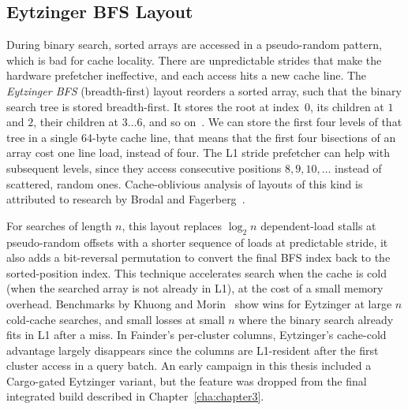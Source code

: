 \subsection{Eytzinger BFS Layout\label{sec:bg:eytzinger}}

During binary search, sorted arrays are accessed in a pseudo-random pattern, which is bad for cache locality. There are unpredictable strides that make the hardware prefetcher ineffective, and each access hits a new cache line. The \emph{Eytzinger BFS} (breadth-first) layout reorders a sorted array, such that the binary search tree is stored breadth-first. It stores the root at index~$0$, its children at $1$ and $2$, their children at $3\ldots 6$, and so on~\cite{khuong_morin_2017}. We can store the first four levels of that tree in a single 64-byte cache line, that means that the first four bisections of an array cost one line load, instead of four. The L1 stride prefetcher can help with subsequent levels, since they access consecutive positions $8, 9, 10, \ldots$ instead of scattered, random ones. Cache-oblivious analysis of layouts of this kind is attributed to research by Brodal and Fagerberg~\cite{brodal_fagerberg_2006}.

For searches of length $n$, this layout replaces $\log_2 n$ dependent-load stalls at pseudo-random offsets with a shorter sequence of loads at predictable stride, it also adds a bit-reversal permutation to convert the final BFS index back to the sorted-position index. This technique accelerates search when the cache is cold (when the searched array is not already in L1), at the cost of a small memory overhead. Benchmarks by Khuong and Morin~\cite{khuong_morin_2017} show wins for Eytzinger at large $n$ cold-cache searches, and small losses at small $n$ where the binary search already fits in L1 after a miss. In Fainder's per-cluster columns, Eytzinger's cache-cold advantage largely disappears since the columns are L1-resident after the first cluster access in a query batch. An early campaign in this thesis included a Cargo-gated Eytzinger variant, but the feature was dropped from the final integrated build described in Chapter~\ref{cha:chapter3}.

